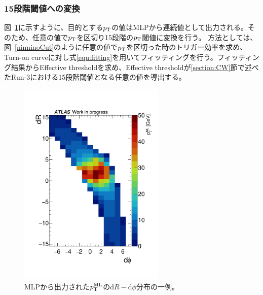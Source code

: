 \subsubsection{15段階閾値への変換}
図~\ref{fig:all_output}に示すように、目的とする$p_{\rm{T}}$の値はMLPから連続値として出力される。そのため、任意の値で$p_{\rm{T}}$を区切り15段階の$p_{\rm{T}}$閾値に変換を行う。
方法としては、図~\ref{ninninoCut}のように任意の値で$p_{\rm{T}}$を区切った時のトリガー効率を求め、Turn-on curveに対し式\eqref{equ:fitting}を用いてフィッティングを行う。フィッティング結果からEffective thresholdを求め、Effective thresholdが\ref{section:CW}節で述べたRun-3における15段階閾値となる任意の値を導出する。
\begin{figure}[tb]
  \centering
  \hspace*{-1cm}
  \includegraphics[clip, width=7cm]{fig/4/data_phi0_roi33_output.pdf}
  \caption{MLPから出力された$p_{\rm{T}}^{\rm{ML}}$のd$R-$d$\phi$分布の一例。}
  \label{fig:all_output}
\end{figure}

